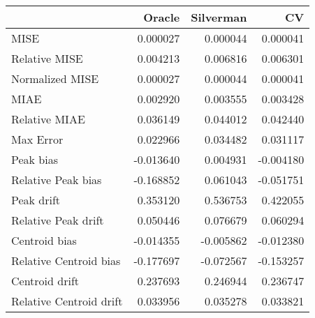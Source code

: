 \begin{tabular}{lrrr}
  \hline
 & Oracle & Silverman & CV \\ 
  \hline
MISE & 0.000027 & 0.000044 & 0.000041 \\ 
  Relative MISE & 0.004213 & 0.006816 & 0.006301 \\ 
  Normalized MISE & 0.000027 & 0.000044 & 0.000041 \\ 
  MIAE & 0.002920 & 0.003555 & 0.003428 \\ 
  Relative MIAE & 0.036149 & 0.044012 & 0.042440 \\ 
  Max Error & 0.022966 & 0.034482 & 0.031117 \\ 
  Peak bias & -0.013640 & 0.004931 & -0.004180 \\ 
  Relative Peak bias & -0.168852 & 0.061043 & -0.051751 \\ 
  Peak drift & 0.353120 & 0.536753 & 0.422055 \\ 
  Relative Peak drift & 0.050446 & 0.076679 & 0.060294 \\ 
  Centroid bias & -0.014355 & -0.005862 & -0.012380 \\ 
  Relative Centroid bias & -0.177697 & -0.072567 & -0.153257 \\ 
  Centroid drift & 0.237693 & 0.246944 & 0.236747 \\ 
  Relative Centroid drift & 0.033956 & 0.035278 & 0.033821 \\ 
   \hline
\end{tabular}
